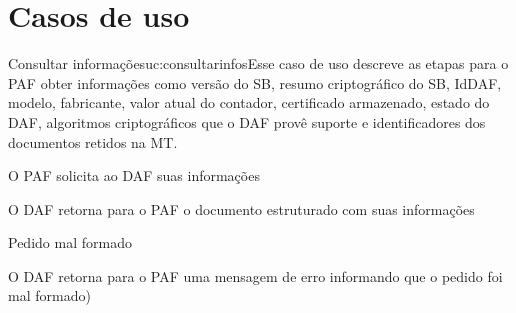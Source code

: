 \documentclass[11pt]{../../classes/ifscarticle}
\begin{document}
\section{Casos de uso}\label{sec:casos_de_uso}


\begin{usecase}{Consultar informações}{uc:consultarinfos}{Esse caso de uso descreve as etapas para o PAF obter informações como versão do SB, resumo criptográfico do SB, IdDAF, modelo, fabricante, valor atual do contador, certificado armazenado, estado do DAF, algoritmos criptográficos que o DAF provê suporte e identificadores dos documentos retidos na MT.}
    \begin{cabecalhoUC}
    \end{cabecalhoUC}

    \begin{fluxoprincipal}
        \item O PAF solicita ao DAF suas informações 
        \item O DAF retorna para o PAF o documento estruturado com suas informações
    \end{fluxoprincipal}  

    \begin{fluxoexcecao}{Pedido mal formado}
        \item O DAF retorna para o PAF uma mensagem de erro informando que o pedido foi mal formado)
    \end{fluxoexcecao}   
\end{usecase}



\end{document}

